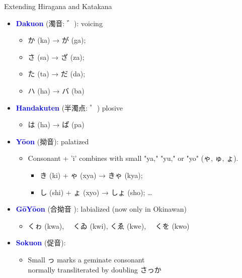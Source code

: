 \documentclass[xetex]{beamer}
\newcommand{\jpn}{\mtciteform}
\newcommand{\txx}[1]{\textcolor{blue}{\textbf{#1}}}
\begin{document}
\begin{frame}{Extending Hiragana and Katakana}

  \begin{itemize}
    \item \txx{Dakuon} (\textjapanese{濁音: ゛}): voicing
     \begin{itemize}
     \item        \textjapanese{か} (ka) → \textjapanese{が} (ga);
     \item       \textjapanese{さ} (sa) → \textjapanese{ざ} (za);
     \item       \textjapanese{た} (ta) → \textjapanese{だ} (da);
     \item      \textjapanese{ハ} (ha) → \textjapanese{バ} (ba)
     \end{itemize}
   \item \txx{Handakuten} (\textjapanese{半濁点: ゜}) plosive
      \begin{itemize}
      \item \textjapanese{は} (ha) → \textjapanese{ぱ} (pa)
    \end{itemize}
 \item \txx{Yōon} (\textjapanese{拗音}): palatized
   \begin{itemize}
   \item Consonant + 'i' combines with small "ya," "yu," or "yo"
      (\textjapanese{ゃ}, \textjapanese{ゅ}, \textjapanese{ょ}).
     \begin{itemize}
     \item      \textjapanese{き} (ki) + \textjapanese{ゃ} (xya) → \textjapanese{きゃ} (kya); 
     \item \textjapanese{し} (shi) + \textjapanese{ょ} (xyo) → \textjapanese{しょ} (sho); \ldots
     \end{itemize}
   \end{itemize}
 \item \txx{GōYōon} (\textjapanese{合拗音 }): labialized (now only in Okinawan)
    \begin{itemize}
    \item  \textjapanese{くゎ} (kwa),　 \textjapanese{くゐ} (kwi),
      \textjapanese{くゑ} (kwe),　 \textjapanese{くを} (kwo)
   \end{itemize}
 \item \txx{Sokuon} (\textjapanese{促音}):
   \begin{itemize}
   \item Small \textjapanese{っ} marks a geminate consonant
     \\ normally transliterated by doubling \textjapanese{さっか} \jpn{sakka}
   \end{itemize}
 \end{itemize}
\end{frame}
\end{document}
